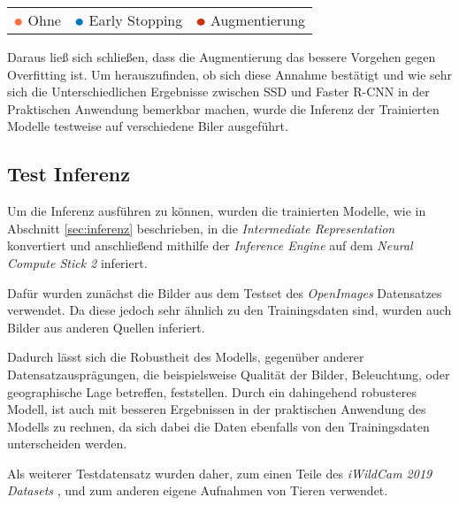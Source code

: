 \begin{table}[htb]
  \centering
  \begin{tabular}{m{}<{\centering}
                  m{}<{\centering}
                  m{}<{\centering}}
      $\color[HTML]{FF7043}\medbullet$  Ohne 
    & $\color[HTML]{0077BB}\medbullet$  Early Stopping 
    & $\color[HTML]{CC3311}\medbullet$  Augmentierung
  \end{tabular}    
\end{table}


Daraus ließ sich schließen, dass die Augmentierung das 
bessere Vorgehen gegen Overfitting ist.
Um herauszufinden, ob sich diese Annahme bestätigt 
und wie sehr sich die Unterschiedlichen Ergebnisse
zwischen SSD und Faster R-CNN in der Praktischen Anwendung
bemerkbar machen, wurde die Inferenz der
Trainierten Modelle testweise auf verschiedene Biler
ausgeführt.


\subsection{Test Inferenz}\label{sec:test_inferenz}

Um die Inferenz ausführen zu 
können, wurden die trainierten Modelle, wie in Abschnitt
\ref{sec:inferenz} beschrieben, 
in die \textit{Intermediate Representation} konvertiert 
und anschließend mithilfe der \textit{Inference Engine} auf 
dem \textit{Neural Compute Stick 2} inferiert.

Dafür wurden zunächst die Bilder aus dem Testset des
\textit{OpenImages} Datensatzes verwendet. Da diese jedoch 
sehr ähnlich zu den Trainingsdaten sind, wurden 
auch Bilder aus anderen Quellen inferiert.

Dadurch lässt sich die Robustheit des Modells, 
gegenüber anderer Datensatzausprägungen, die beispielsweise 
Qualität der Bilder, Beleuchtung, oder geographische Lage 
betreffen, feststellen.
Durch ein dahingehend robusteres Modell, ist auch 
mit besseren Ergebnissen in der praktischen Anwendung 
des Modells zu rechnen, da sich dabei die Daten 
ebenfalls von den Trainingsdaten unterscheiden werden.

Als weiterer Testdatensatz wurden daher, zum einen Teile des
\textit{iWildCam 2019 Datasets} \cite{beery2019iwildcam},
und zum anderen eigene Aufnahmen von Tieren 
verwendet.


